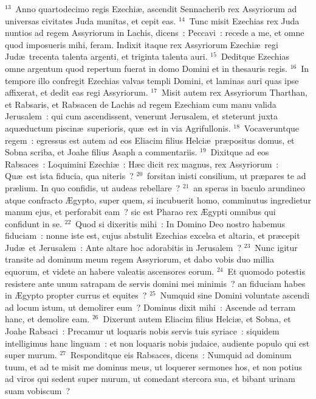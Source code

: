 ${}^{13}$~Anno quartodecimo regis Ezechi\ae , ascendit Sennacherib rex Assyriorum ad universas civitates Juda munitas, et cepit eas.
${}^{14}$~Tunc misit Ezechias rex Juda nuntios ad regem Assyriorum in Lachis, dicens~: Peccavi~: recede a me, et omne quod imposueris mihi, feram. Indixit itaque rex Assyriorum Ezechi\ae\ regi Jud\ae\ trecenta talenta argenti, et triginta talenta auri.
${}^{15}$~Deditque Ezechias omne argentum quod repertum fuerat in domo Domini et in thesauris regis.
${}^{16}$~In tempore illo confregit Ezechias valvas templi Domini, et laminas auri quas ipse affixerat, et dedit eas regi Assyriorum.
${}^{17}$~Misit autem rex Assyriorum Tharthan, et Rabsaris, et Rabsacen de Lachis ad regem Ezechiam cum manu valida Jerusalem~: qui cum ascendissent, venerunt Jerusalem, et steterunt juxta aqu\ae ductum piscin\ae\ superioris, qu\ae\ est in via Agrifullonis.
${}^{18}$~Vocaveruntque regem~: egressus est autem ad eos Eliacim filius Helci\ae\ pr\ae positus domus, et Sobna scriba, et Joahe filius Asaph a commentariis.
${}^{19}$~Dixitque ad eos Rabsaces~: Loquimini Ezechi\ae~: H\ae c dicit rex magnus, rex Assyriorum~: Qu\ae\ est ista fiducia, qua niteris~?
${}^{20}$~forsitan inisti consilium, ut pr\ae pares te ad pr\ae lium. In quo confidis, ut audeas rebellare~?
${}^{21}$~an speras in baculo arundineo atque confracto \AE gypto, super quem, si incubuerit homo, comminutus ingredietur manum ejus, et perforabit eam~? sic est Pharao rex \AE gypti omnibus qui confidunt in se.
${}^{22}$~Quod si dixeritis mihi~: In Domino Deo nostro habemus fiduciam~: nonne iste est, cujus abstulit Ezechias excelsa et altaria, et pr\ae cepit Jud\ae\ et Jerusalem~: Ante altare hoc adorabitis in Jerusalem~?
${}^{23}$~Nunc igitur transite ad dominum meum regem Assyriorum, et dabo vobis duo millia equorum, et videte an habere valeatis ascensores eorum.
${}^{24}$~Et quomodo potestis resistere ante unum satrapam de servis domini mei minimis~? an fiduciam habes in \AE gypto propter currus et equites~?
${}^{25}$~Numquid sine Domini voluntate ascendi ad locum istum, ut demolirer eum~? Dominus dixit mihi~: Ascende ad terram hanc, et demolire eam.
${}^{26}$~Dixerunt autem Eliacim filius Helci\ae , et Sobna, et Joahe Rabsaci~: Precamur ut loquaris nobis servis tuis syriace~: siquidem intelligimus hanc linguam~: et non loquaris nobis judaice, audiente populo qui est super murum.
${}^{27}$~Responditque eis Rabsaces, dicens~: Numquid ad dominum tuum, et ad te misit me dominus meus, ut loquerer sermones hos, et non potius ad viros qui sedent super murum, ut comedant stercora sua, et bibant urinam suam vobiscum~?
